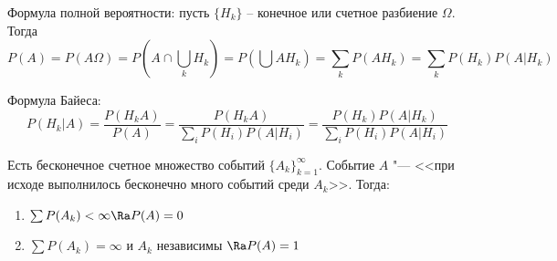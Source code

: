 Формула полной вероятности: пусть $\{H_k\}$ -- конечное или счетное разбиение $\Omega$. Тогда
$$ P(A) = P(A\Omega) = P(A \cap \bigcup\limits_k H_k) = P(\bigcup AH_k) = \sum\limits_k P(AH_k) = \sum\limits_k P(H_k) P(A | H_k)$$


Формула Байеса: 
$$ P(H_k | A) = \frac{P(H_k A)}{P(A)} = \frac{P(H_k A)}{\sum\limits_i P(H_i) P(A | H_i)} = \frac{P(H_k) P(A | H_k)}{\sum\limits_i P(H_i) P(A | H_i)}$$

\begin{lemma}
Есть бесконечное счетное множество событий $\{A_k\}_{k=1}^{\infty}$.
Событие $A$ "--- <<при исходе выполнилось бесконечно много событий среди $A_k$>>. Тогда:
\begin{enumerate}
    \item $\sum P(A_k) < \infty \Ra P(A) = 0$
    \item $\sum P(A_k) = \infty$ и $A_k$ независимы $\Ra P(A) = 1$
\end{enumerate}    
\end{lemma}
